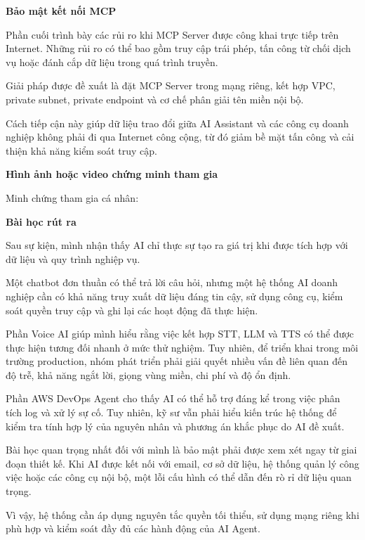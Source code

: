 \vspace{0.5em}\noindent\textbf{Bảo mật kết nối
MCP}\par

Phần cuối trình bày các rủi ro khi MCP Server được công khai trực tiếp
trên Internet. Những rủi ro có thể bao gồm truy cập trái phép, tấn công
từ chối dịch vụ hoặc đánh cắp dữ liệu trong quá trình truyền.

Giải pháp được đề xuất là đặt MCP Server trong mạng riêng, kết hợp VPC,
private subnet, private endpoint và cơ chế phân giải tên miền nội bộ.

Cách tiếp cận này giúp dữ liệu trao đổi giữa AI Assistant và các công cụ
doanh nghiệp không phải đi qua Internet công cộng, từ đó giảm bề mặt tấn
công và cải thiện khả năng kiểm soát truy cập.

\vspace{0.5em}\noindent\textbf{Hình ảnh hoặc video chứng minh tham
gia}\par

Minh chứng tham gia cá nhân:

\vspace{0.5em}\noindent\textbf{Bài học rút ra}\par

Sau sự kiện, mình nhận thấy AI chỉ thực sự tạo ra giá trị khi được tích
hợp với dữ liệu và quy trình nghiệp vụ.

Một chatbot đơn thuần có thể trả lời câu hỏi, nhưng một hệ thống AI
doanh nghiệp cần có khả năng truy xuất dữ liệu đáng tin cậy, sử dụng
công cụ, kiểm soát quyền truy cập và ghi lại các hoạt động đã thực hiện.

Phần Voice AI giúp mình hiểu rằng việc kết hợp STT, LLM và TTS có thể
được thực hiện tương đối nhanh ở mức thử nghiệm. Tuy nhiên, để triển
khai trong môi trường production, nhóm phát triển phải giải quyết nhiều
vấn đề liên quan đến độ trễ, khả năng ngắt lời, giọng vùng miền, chi phí
và độ ổn định.

Phần AWS DevOps Agent cho thấy AI có thể hỗ trợ đáng kể trong việc phân
tích log và xử lý sự cố. Tuy nhiên, kỹ sư vẫn phải hiểu kiến trúc hệ
thống để kiểm tra tính hợp lý của nguyên nhân và phương án khắc phục do
AI đề xuất.

Bài học quan trọng nhất đối với mình là bảo mật phải được xem xét ngay
từ giai đoạn thiết kế. Khi AI được kết nối với email, cơ sở dữ liệu, hệ
thống quản lý công việc hoặc các công cụ nội bộ, một lỗi cấu hình có thể
dẫn đến rò rỉ dữ liệu quan trọng.

Vì vậy, hệ thống cần áp dụng nguyên tắc quyền tối thiểu, sử dụng mạng
riêng khi phù hợp và kiểm soát đầy đủ các hành động của AI Agent.

